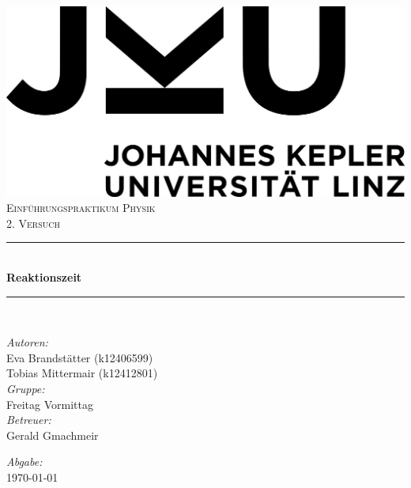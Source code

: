\documentclass[a4paper,12pt]{article}
\begin{document}
\begin{titlepage}
    \centering
    \includegraphics[scale = 0.03]{bilder/JKU_Logo.png}\\[1.0 cm]	%
    \textsc{\Large Einführungspraktikum Physik}\\[0.5 cm]	        %
    \textsc{\large 2. Versuch}\\[0.5 cm]				            %
    \rule{\linewidth}{0.4 mm} \\[0.4 cm]
    { \huge \bfseries Reaktionszeit}\\                              %
    \rule{\linewidth}{0.4 mm} \\[1.5 cm]
    \begin{minipage}{0.8\textwidth}
        \begin{flushleft} \large
            \emph{Autoren:}\\
            Eva Brandstätter (k12406599)\\
            Tobias Mittermair (k12412801)\\
            \vspace{1cm}
            \emph{Gruppe:}\\
            Freitag Vormittag\\
            \vspace{1cm}
            \emph{Betreuer:}\\
            Gerald Gmachmeir
        \end{flushleft}
        \begin{flushright} \large
            \vspace{8cm}
            \emph{Abgabe:} \\
            \today
        \end{flushright}
    \end{minipage}~    
\end{titlepage}
\end{document}
